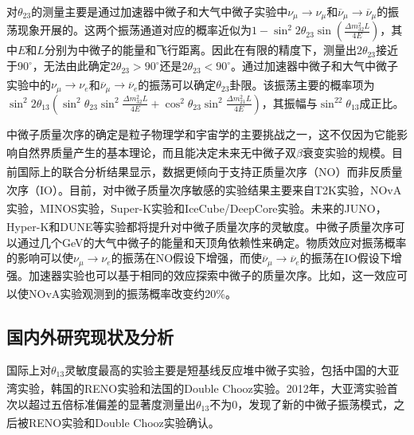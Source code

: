 \documentclass[a4paper,zihao=-4]{article}
\newcommand{\citess}[1]{\textsuperscript{\cite{#1}}}
\begin{document}
对$\theta_{23}$的测量主要是通过加速器中微子和大气中微子实验中$\nu_\mu\to\nu_\mu$和$\overline{\nu}_\mu\to\overline{\nu}_\mu$的振荡现象开展的。这两个振荡通道对应的概率近似为$1-\sin ^2 2 \theta_{23} \sin \left(\frac{\Delta m_{32}^2 L}{4 E}\right)$，其中$E$和$L$分别为中微子的能量和飞行距离。因此在有限的精度下，测量出$2\theta_{23}$接近于$90^\circ$，无法由此确定$2\theta_{23}>90^\circ$还是$2\theta_{23}<90^\circ$。通过加速器中微子和大气中微子实验中的$\nu_\mu\to\nu_e$和$\overline{\nu}_\mu\to\overline{\nu}_e$的振荡可以确定$\theta_{23}$卦限\citess{Agarwalla:2013ju}。该振荡主要的概率项为$\sin ^2 2 \theta_{13} \left(\sin ^2 \theta_{23} \sin ^2 \frac{\Delta m_{32}^2 L}{4 E}+ \cos ^2 \theta_{23} \sin ^2 \frac{\Delta m_{21}^2 L}{4 E}\right)$，其振幅与$\sin^22\theta_{13}$成正比。

中微子质量次序的确定是粒子物理学和宇宙学的主要挑战之一，这不仅因为它能影响自然界质量产生的基本理论，而且能决定未来无中微子双$\beta$衰变实验的规模\citess{Gariazzo:2022ahe}。目前国际上的联合分析\citess{Esteban:2020cvm,Kelly:2020fkv}结果显示，数据更倾向于支持正质量次序（NO）而非反质量次序（IO）。目前，对中微子质量次序敏感的实验结果主要来自T2K实验\citess{T2K:2021xwb}，NOvA实验\citess{NOvA:2021nfi}，MINOS实验\citess{2018npa..confE.423A}，Super-K实验\citess{Super-Kamiokande:2017yvm}和IceCube/DeepCore实验\citess{IceCube:2017lak}。未来的JUNO\citess{JUNO:2021vlw}，Hyper-K\citess{Hyper-Kamiokande:2022smq}和DUNE\citess{DUNE:2020fgq}等实验都将提升对中微子质量次序的灵敏度。中微子质量次序可以通过几个GeV的大气中微子的能量和天顶角依赖性来确定。物质效应对振荡概率的影响可以使$\nu_\mu\to\nu_e$的振荡在NO假设下增强，而使$\overline{\nu}_\mu\to\overline{\nu}_e$的振荡在IO假设下增强。加速器实验也可以基于相同的效应探索中微子的质量次序。比如，这一效应可以使NOvA实验观测到的振荡概率改变约20\%\citess{NOvA:2021nfi}。

\subsection{国内外研究现状及分析}
国际上对$\theta_{13}$灵敏度最高的实验主要是短基线反应堆中微子实验，包括中国的大亚湾实验\citess{DayaBay:2022orm}，韩国的RENO实验\citess{RENO:2018dro}和法国的Double Chooz实验\citess{DoubleChooz:2019qbj}。2012年，大亚湾实验\citess{DayaBay:2012fng}首次以超过五倍标准偏差的显著度测量出$\theta_{13}$不为0，发现了新的中微子振荡模式，之后被RENO实验\citess{RENO:2012mkc}和Double Chooz实验\citess{DoubleChooz:2012gmf}确认。
\end{document}
